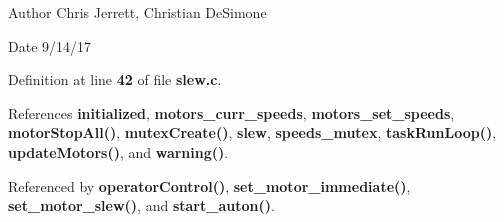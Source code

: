 \begin{DoxyAuthor}{Author}
Chris Jerrett, Christian De\+Simone 
\end{DoxyAuthor}
\begin{DoxyDate}{Date}
9/14/17 
\end{DoxyDate}


Definition at line \textbf{ 42} of file \textbf{ slew.\+c}.



References \textbf{ initialized}, \textbf{ motors\+\_\+curr\+\_\+speeds}, \textbf{ motors\+\_\+set\+\_\+speeds}, \textbf{ motor\+Stop\+All()}, \textbf{ mutex\+Create()}, \textbf{ slew}, \textbf{ speeds\+\_\+mutex}, \textbf{ task\+Run\+Loop()}, \textbf{ update\+Motors()}, and \textbf{ warning()}.



Referenced by \textbf{ operator\+Control()}, \textbf{ set\+\_\+motor\+\_\+immediate()}, \textbf{ set\+\_\+motor\+\_\+slew()}, and \textbf{ start\+\_\+auton()}.


